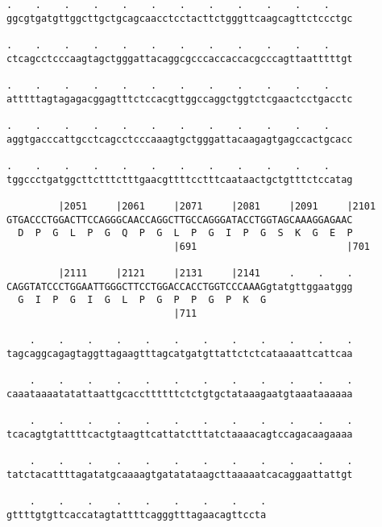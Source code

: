 \documentclass{article}
\begin{document}
\begin{Verbatim}
.    .    .    .    .    .    .    .    .    .    .    .    
ggcgtgatgttggcttgctgcagcaacctcctacttctgggttcaagcagttctccctgc
                                                            
.    .    .    .    .    .    .    .    .    .    .    .    
ctcagcctcccaagtagctgggattacaggcgcccaccaccacgcccagttaatttttgt
                                                            
.    .    .    .    .    .    .    .    .    .    .    .    
atttttagtagagacggagtttctccacgttggccaggctggtctcgaactcctgacctc
                                                            
.    .    .    .    .    .    .    .    .    .    .    .    
aggtgacccattgcctcagcctcccaaagtgctgggattacaagagtgagccactgcacc
                                                            
.    .    .    .    .    .    .    .    .    .    .    .    
tggccctgatggcttctttctttgaacgttttcctttcaataactgctgtttctccatag
                                                            
         |2051     |2061     |2071     |2081     |2091     |2101
GTGACCCTGGACTTCCAGGGCAACCAGGCTTGCCAGGGATACCTGGTAGCAAAGGAGAAC
  D  P  G  L  P  G  Q  P  G  L  P  G  I  P  G  S  K  G  E  P
                             |691                          |701
  
         |2111     |2121     |2131     |2141     .    .    .
CAGGTATCCCTGGAATTGGGCTTCCTGGACCACCTGGTCCCAAAGgtatgttggaatggg
  G  I  P  G  I  G  L  P  G  P  P  G  P  K  G               
                             |711                           
  
    .    .    .    .    .    .    .    .    .    .    .    .
tagcaggcagagtaggttagaagtttagcatgatgttattctctcataaaattcattcaa
                                                            
    .    .    .    .    .    .    .    .    .    .    .    .
caaataaaatatattaattgcaccttttttctctgtgctataaagaatgtaaataaaaaa
                                                            
    .    .    .    .    .    .    .    .    .    .    .    .
tcacagtgtattttcactgtaagttcattatctttatctaaaacagtccagacaagaaaa
                                                            
    .    .    .    .    .    .    .    .    .    .    .    .
tatctacattttagatatgcaaaagtgatatataagcttaaaaatcacaggaattattgt
                                                            
    .    .    .    .    .    .    .    .    .
gttttgtgttcaccatagtattttcagggtttagaacagttccta
                                             

\end{Verbatim}
\end{document}
